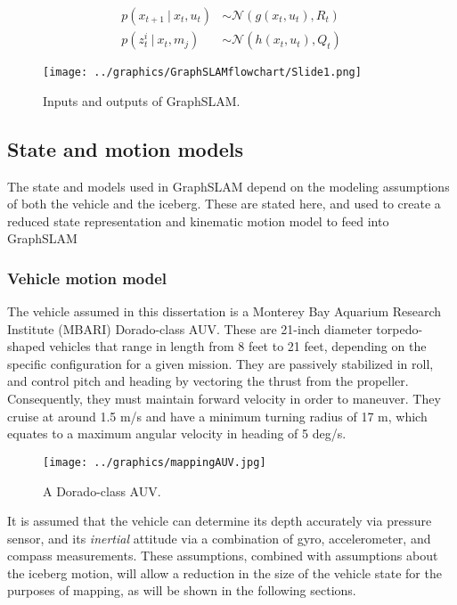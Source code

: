 \begin{align}
p\left(x_{t+1}~|~x_t,u_t\right) & \sim \mathcal{N}\left(g(x_t,u_t), R_t\right) \\
p\left(z^i_{t}~|~x_t,m_j\right) & \sim \mathcal{N}\left(h(x_t,u_t), Q_t\right)
\end{align}

\begin{figure}[htb]
   \centering
   \texttt{[image: ../graphics/GraphSLAMflowchart/Slide1.png]} %
   \caption{Inputs and outputs of GraphSLAM.}
   \label{fig:GraphSLAMIO}
\end{figure}

\subsection{State and motion models}

The state and models used in GraphSLAM depend on the modeling assumptions of both the vehicle and the iceberg. These are stated here, and used to create a reduced state representation and kinematic motion model to feed into GraphSLAM

\subsubsection{Vehicle motion model}
\label{sec:VehicleMotion}
The vehicle assumed in this dissertation is a Monterey Bay Aquarium Research Institute (MBARI) Dorado-class AUV. These are 21-inch diameter torpedo-shaped vehicles that range in length from 8 feet to 21 feet, depending on the specific configuration for a given mission. They are passively stabilized in roll, and control pitch and heading by vectoring the thrust from the propeller. Consequently, they must maintain forward velocity in order to maneuver. They cruise at around 1.5 m/s and have a minimum turning radius of 17 m, which equates to a maximum angular velocity in heading of 5 deg/s. \cite{?}

\begin{figure}[htb]
   \centering
   \texttt{[image: ../graphics/mappingAUV.jpg]} %
   \caption{A Dorado-class AUV.}
   \label{fig:mappingAUV}
\end{figure}

It is assumed that the vehicle can determine its depth accurately via pressure sensor, and its \emph{inertial} attitude via a combination of gyro, accelerometer, and compass measurements. These assumptions, combined with assumptions about the iceberg motion, will allow a reduction in the size of the vehicle state for the purposes of mapping, as will be shown in the following sections.

